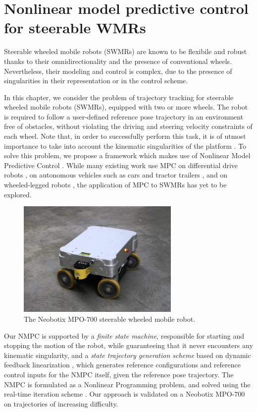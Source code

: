 \chapter{Nonlinear model predictive control for steerable WMRs}
\label{ch:nmpc-swmr}
Steerable wheeled mobile robots (SWMRs) are known to be flexibile and robust
thanks to their omnidirectionality and the presence of conventional wheels.
Nevertheless, their modeling and control is complex, due
to the presence of singularities in their representation or in the control
scheme.

In this chapter, we consider the problem of trajectory tracking for steerable
wheeled mobile robots (SWMRs), equipped with two or more wheels.
The robot is required to follow a user-defined reference pose trajectory in
an environment free of obstacles, without violating the driving and steering
velocity constraints of each wheel. Note that, in order to successfully perform
this task, it is of utmost importance to take into account the kinematic
singularities of the platform \cite{Sorour2019RAS}. To solve this
problem, we propose a framework which makes use of
Nonlinear Model Predictive Control \cite{Rawlings2017MPCBook}.
While many existing work use MPC on differential drive robots \cite{Tarantos2023Springer},
on autonomous vehicles such as cars \cite{Zanon2014Springer} and tractor trailers
\cite{Beglini2022TMECH}, and on wheeled-legged robots \cite{Bjelonic2021IROS},
the application of MPC to SWMRs has yet to be explored.

\begin{figure}
    \centering
    \includegraphics[width=0.7\textwidth]{figures/SWMR/mpo-700.jpg}
    \caption{The Neobotix MPO-700 steerable wheeled mobile robot.}
    \label{fig:mpo-700}
\end{figure}

Our NMPC is supported by a \textit{finite state machine}, responsible for
starting and stopping the motion of the robot, while guaranteeing that it never
encounters any kinematic singularity, and
a \textit{state trajectory generation scheme} based on dynamic
feedback linearization \cite{Oriolo2002WMRControlDFL}, which generates
reference configurations and reference control inputs for the NMPC
itself, given the reference pose trajectory. 
The NMPC is formulated as a Nonlinear Programming problem, and solved using the
real-time iteration scheme \cite{Gros2020Fromlineartononlinear}.
Our approach is validated on a
Neobotix MPO-700 on trajectories of increasing difficulty.


